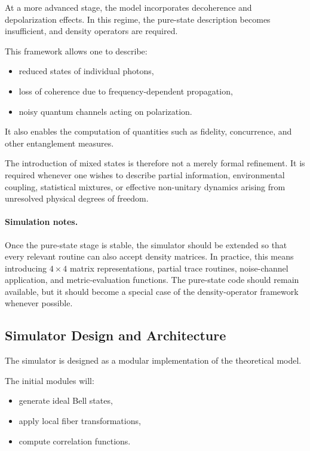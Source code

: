 \documentclass[a4paper]{article}
\begin{document}
At a more advanced stage, the model incorporates decoherence and depolarization effects. In this regime, the pure-state description becomes insufficient, and density operators are required.

This framework allows one to describe:
\begin{itemize}
    \item reduced states of individual photons,
    \item loss of coherence due to frequency-dependent propagation,
    \item noisy quantum channels acting on polarization.
\end{itemize}

It also enables the computation of quantities such as fidelity, concurrence, and other entanglement measures.

The introduction of mixed states is therefore not a merely formal refinement. It is required whenever one wishes to describe partial information, environmental coupling, statistical mixtures, or effective non-unitary dynamics arising from unresolved physical degrees of freedom.

\paragraph{Simulation notes.}
Once the pure-state stage is stable, the simulator should be extended so that every relevant routine can also accept density matrices. In practice, this means introducing \(4 \times 4\) matrix representations, partial trace routines, noise-channel application, and metric-evaluation functions. The pure-state code should remain available, but it should become a special case of the density-operator framework whenever possible.

\subsection{Simulator Design and Architecture}

The simulator is designed as a modular implementation of the theoretical model.

The initial modules will:
\begin{itemize}
    \item generate ideal Bell states,
    \item apply local fiber transformations,
    \item compute correlation functions.
\end{itemize}
\end{document}

